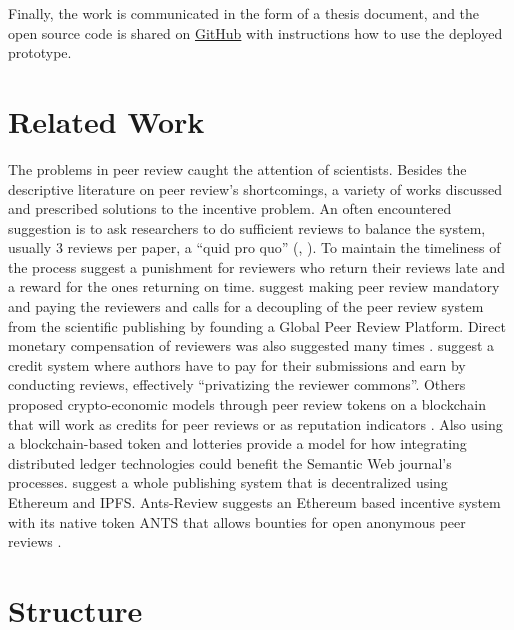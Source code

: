 Finally, the work is communicated in the form of a thesis document, and the open source code is shared on \href{https://github.com/kuzdogan/peer-review-verifiable-credentials-thesis}{GitHub} with instructions how to use the deployed prototype. 


\section{Related Work}

The problems in peer review caught the attention of scientists. Besides the descriptive literature on peer review’s shortcomings, a variety of works discussed and prescribed solutions to the incentive problem. An often encountered suggestion is to ask researchers to do sufficient reviews to balance the system, usually 3 reviews per paper, a “quid pro quo” (\cite{Derraik.2015}, \cite[5201]{Grainger.2007}). To maintain the timeliness of the process \cite{Hauser.2007} suggest a punishment for reviewers who return their reviews late and a reward for the ones returning on time. \cite{Ferreira.2016} suggest making peer review mandatory and paying the reviewers and calls for a decoupling of the peer review system from the scientific publishing by founding a Global Peer Review Platform. Direct monetary compensation of reviewers was also suggested many times \parencite{Prufer.2010}. \cite{Fox.2010} suggest a credit system where authors have to pay for their submissions and earn by conducting reviews, effectively “privatizing the reviewer commons”. Others proposed crypto-economic models through peer review tokens on a blockchain that will work as credits for peer reviews or as reputation indicators \parencite{Avital.2018, Jan.2018c, Spearpoint.2017, Tarkhanov.2020}. Also using a blockchain-based token and lotteries \cite{Janowicz.2018} provide a model for how integrating distributed ledger technologies could benefit the Semantic Web journal’s processes. \cite{TenorioFornes.2019} suggest a whole publishing system that is decentralized using Ethereum and IPFS. Ants-Review suggests an Ethereum based incentive system with its native token ANTS that allows bounties for open anonymous peer reviews \parencite{TrovoMassari}.

\section{Structure}

